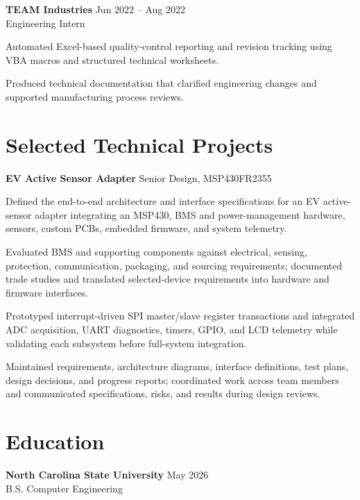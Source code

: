 \documentclass[10pt,letterpaper]{article}
\begin{document}
\textbf{TEAM Industries} \hfill Jun 2022 -- Aug 2022\\
Engineering Intern
\begin{compactitem}
  \item Automated Excel-based quality-control reporting and revision tracking using VBA macros and structured technical worksheets.
  \item Produced technical documentation that clarified engineering changes and supported manufacturing process reviews.
\end{compactitem}

\section{Selected Technical Projects}
\textbf{EV Active Sensor Adapter} \hfill Senior Design, MSP430FR2355\\
\begin{compactitem}
  \item Defined the end-to-end architecture and interface specifications for an EV active-sensor adapter integrating an MSP430, BMS and power-management hardware, sensors, custom PCBs, embedded firmware, and system telemetry.
  \item Evaluated BMS and supporting components against electrical, sensing, protection, communication, packaging, and sourcing requirements; documented trade studies and translated selected-device requirements into hardware and firmware interfaces.
  \item Prototyped interrupt-driven SPI master/slave register transactions and integrated ADC acquisition, UART diagnostics, timers, GPIO, and LCD telemetry while validating each subsystem before full-system integration.
  \item Maintained requirements, architecture diagrams, interface definitions, test plans, design decisions, and progress reports; coordinated work across team members and communicated specifications, risks, and results during design reviews.
\end{compactitem}

\section{Education}
\textbf{North Carolina State University} \hfill May 2026\\
B.S. Computer Engineering
\end{document}
